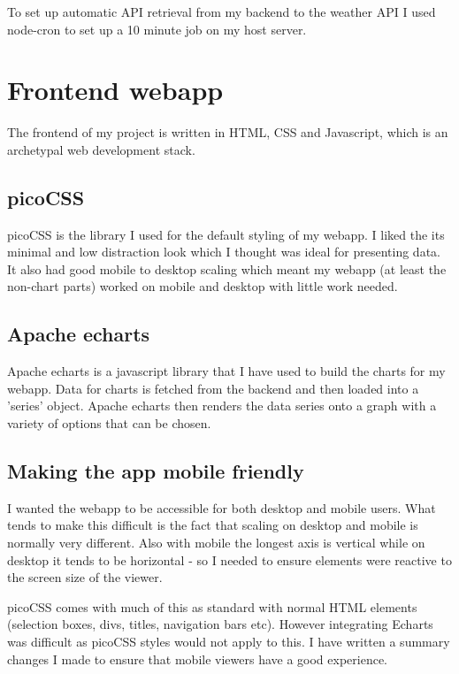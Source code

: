 To set up automatic API retrieval from my backend to the weather API I used
node-cron to set up a 10 minute job on my host server.

\section{Frontend webapp}

The frontend of my project is written in HTML, CSS and Javascript, which is an
archetypal web development stack.

\subsection{picoCSS}

picoCSS is the library I used for the default styling of my webapp. I liked the
its minimal and low distraction look which I thought was ideal for presenting
data. It also had good mobile to desktop scaling which meant my webapp (at least
the non-chart parts) worked on mobile and desktop with little work needed.

\subsection{Apache echarts}

Apache echarts is a javascript library that I have used to build the charts for
my webapp. Data for charts is fetched from the backend and then loaded into a
'series' object. Apache echarts then renders the data series onto a graph with a
variety of options that can be chosen.


\subsection{Making the app mobile friendly}

I wanted the webapp to be accessible for both desktop and mobile users. What
tends to make this difficult is the fact that scaling on desktop and mobile is
normally very different. Also with mobile the longest axis is vertical while on
desktop it tends to be horizontal - so I needed to ensure elements were reactive
to the screen size of the viewer.

picoCSS comes with much of this as standard with normal HTML elements (selection
boxes, divs, titles, navigation bars etc). However integrating Echarts was
difficult as picoCSS styles would not apply to this. I have written a summary
changes I made to ensure that mobile viewers have a good experience.

